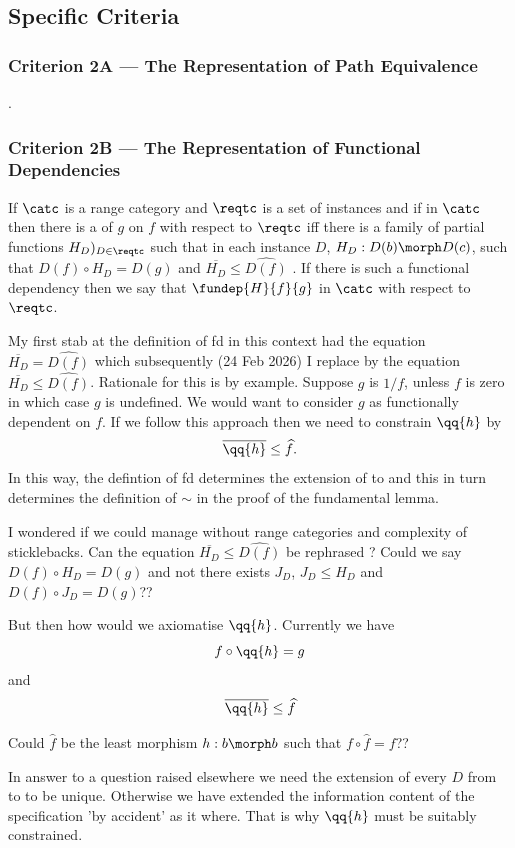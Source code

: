 \subsection{Specific Criteria}
\subsubsection{Criterion 2A --- The Representation of Path Equivalence}
\tbd
{}.
\subsubsection{Criterion 2B --- The Representation of Functional Dependencies}
\begin{definition}
If $\catc$ is a range category and $\reqtc$ is a set of instances and if \fgsourcediag
in $\catc$ then there is a   of $g$ on $f$ with respect to $\reqtc$ iff
there is a family of partial functions $H_D)_{D \in \reqtc}$ such that 
in each instance $D$,  $H_D: D(b) \morph D(c)$, such that $D(f) \circ H_D = D(g)$ and $\overline{H_D}\leq \widehat{D(f)}$ .
If there is such a functional dependency then we say that $\fundep{H}{f}{g}$ in $\catc$ with respect to $\reqtc$.

\begin{rationale}
My first stab at the definition of fd in this context had
the equation $\overline{H_D}=\widehat{D(f)}$ which
subsequently (24 Feb 2026)
I replace by the equation 
$\overline{H_D}\leq \widehat{D(f)}$. 
Rationale for this is by example. Suppose $g$ is $1/f$, 
unless $f$ is zero in which case $g$ is undefined. 
We would want to consider  $g$ as functionally dependent on $f$. 
If we follow this approach then we need to constrain
$\qq{h}$ by 
$$
\overline{\qq{h}} \leq \widehat{f}.
$$
In this way, the defintion of fd determines  the
extension of \catcw to \catcpw and this in turn determines the definition of $\sim$ in the proof of the fundamental lemma.
\end{rationale}
\begin{rationale}
I wondered if  we could manage without range categories and complexity of sticklebacks.
Can the equation $\overline{H_D}\leq \widehat{D(f)}$ be rephrased ?
Could we say $D(f) \circ H_D =D(g)$ and not there exists
$J_D$, $J_D \leq H_D$ and $D(f) \circ J_D = D(g)$??

But then how would we axiomatise $\qq{h}$. Currently we have
$$
f \circ \qq{h} = g
$$
and
$$
\overline{\qq{h}} \leq \widehat{f}
$$

\begin{notebox}[wierdly] Could $\hat{f}$ be the least morphism $h: b \morph b$
such that $f \circ \hat{f} = f$?? 
\end{notebox}

In answer to a question raised elsewhere we need the extension of every $D$
from \catcw to \catcpw to be unique. Otherwise we have extended the information content of the specification 'by accident' as it where. That is why $\qq{h}$
must be suitably constrained.
\end{rationale}
\end{definition}

